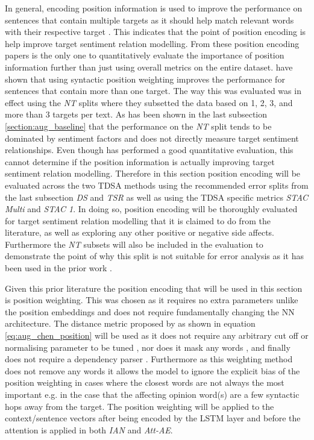 In general, encoding position information is used to improve the performance on sentences that contain multiple targets as it should help match relevant words with their respective target \citep{li-etal-2018-hierarchical, he-etal-2018-exploiting}. This indicates that the point of position encoding is help improve target sentiment relation modelling. From these position encoding papers \citet{he-etal-2018-exploiting} is the only one to quantitatively evaluate the importance of position information further than just using overall metrics on the entire dataset. \citet{he-etal-2018-exploiting} have shown that using syntactic position weighting improves the performance for sentences that contain more than one target. The way this was evaluated was in effect using the \textit{NT} splits where they subsetted the data based on 1, 2, 3, and more than 3 targets per text. As has been shown in the last subsection \ref{section:aug_baseline} that the performance on the \textit{NT} split tends to be dominated by sentiment factors and does not directly measure target sentiment relationships. Even though \citet{he-etal-2018-exploiting} has performed a good quantitative evaluation, this cannot determine if the position information is actually improving target sentiment relation modelling. Therefore in this section position encoding will be evaluated across the two TDSA methods using the recommended error splits from the last subsection \textit{DS} and \textit{TSR} as well as using the TDSA specific metrics \textit{STAC Multi} and \textit{STAC 1}. In doing so, position encoding will be thoroughly evaluated for target sentiment relation modelling that it is claimed to do from the literature, as well as exploring any other positive or negative side affects. Furthermore the \textit{NT} subsets will also be included in the evaluation to demonstrate the point of why this split is not suitable for error analysis as it has been used in the prior work \citep{he-etal-2018-exploiting}. 

Given this prior literature the position encoding that will be used in this section is position weighting. This was chosen as it requires no extra parameters unlike the position embeddings and does not require fundamentally changing the NN architecture. The distance metric proposed by \citet{chen-etal-2017-recurrent} as shown in equation \ref{eq:aug_chen_position} will be used as it does not require any arbitrary cut off or normalising parameter to be tuned \citep{zhao2019modeling, li-etal-2018-transformation}, nor does it mask any words \citep{zhang-etal-2019-aspect}, and finally does not require a dependency parser \citep{he-etal-2018-exploiting}. Furthermore as this weighting method does not remove any words it allows the model to ignore the explicit bias of the position weighting in cases where the closest words are not always the most important e.g. in the case that the affecting opinion word(s) are a few syntactic hops away from the target. The position weighting will be applied to the context/sentence vectors after being encoded by the LSTM layer and before the attention is applied in both \textit{IAN} and \textit{Att-AE}.

